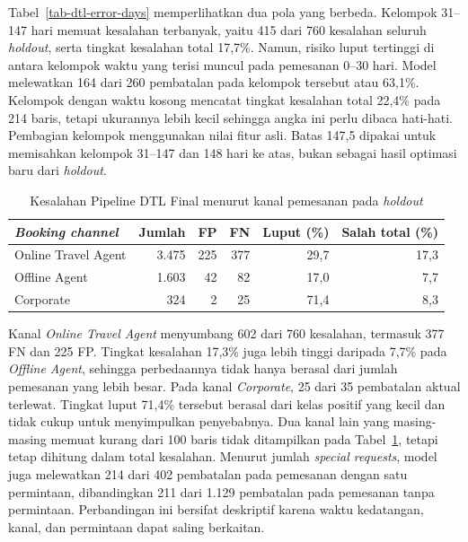 Tabel~\ref{tab-dtl-error-days} memperlihatkan dua pola yang berbeda. Kelompok 31--147 hari memuat kesalahan terbanyak, yaitu 415 dari 760 kesalahan seluruh \textit{holdout}, serta tingkat kesalahan total 17,7\%. Namun, risiko luput tertinggi di antara kelompok waktu yang terisi muncul pada pemesanan 0--30 hari. Model melewatkan 164 dari 260 pembatalan pada kelompok tersebut atau 63,1\%. Kelompok dengan waktu kosong mencatat tingkat kesalahan total 22,4\% pada 214 baris, tetapi ukurannya lebih kecil sehingga angka ini perlu dibaca hati-hati. Pembagian kelompok menggunakan nilai fitur asli. Batas 147,5 dipakai untuk memisahkan kelompok 31--147 dan 148 hari ke atas, bukan sebagai hasil optimasi baru dari \textit{holdout}.

\begin{table}[H]
    \centering
    \caption{Kesalahan Pipeline DTL Final menurut kanal pemesanan pada \textit{holdout}}
    \label{tab-dtl-error-channel}
    \begin{tabular}{lrrrrr}
        \hline
        \textit{Booking channel} & Jumlah & FP  & FN  & Luput (\%) & Salah total (\%) \\
        \hline
        Online Travel Agent      & 3.475  & 225 & 377 & 29,7       & 17,3             \\
        Offline Agent            & 1.603  & 42  & 82  & 17,0       & 7,7              \\
        Corporate                & 324    & 2   & 25  & 71,4       & 8,3              \\
        \hline
    \end{tabular}
\end{table}

Kanal \textit{Online Travel Agent} menyumbang 602 dari 760 kesalahan, termasuk 377 FN dan 225 FP. Tingkat kesalahan 17,3\% juga lebih tinggi daripada 7,7\% pada \textit{Offline Agent}, sehingga perbedaannya tidak hanya berasal dari jumlah pemesanan yang lebih besar. Pada kanal \textit{Corporate}, 25 dari 35 pembatalan aktual terlewat. Tingkat luput 71,4\% tersebut berasal dari kelas positif yang kecil dan tidak cukup untuk menyimpulkan penyebabnya. Dua kanal lain yang masing-masing memuat kurang dari 100 baris tidak ditampilkan pada Tabel~\ref{tab-dtl-error-channel}, tetapi tetap dihitung dalam total kesalahan. Menurut jumlah \textit{special requests}, model juga melewatkan 214 dari 402 pembatalan pada pemesanan dengan satu permintaan, dibandingkan 211 dari 1.129 pembatalan pada pemesanan tanpa permintaan. Perbandingan ini bersifat deskriptif karena waktu kedatangan, kanal, dan permintaan dapat saling berkaitan.

